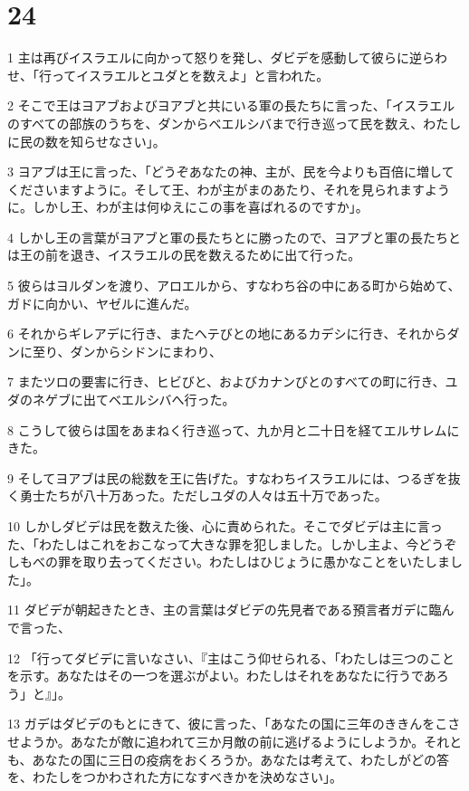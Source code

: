 \chapter{24}

\par 1 主は再びイスラエルに向かって怒りを発し、ダビデを感動して彼らに逆らわせ、「行ってイスラエルとユダとを数えよ」と言われた。
\par 2 そこで王はヨアブおよびヨアブと共にいる軍の長たちに言った、「イスラエルのすべての部族のうちを、ダンからベエルシバまで行き巡って民を数え、わたしに民の数を知らせなさい」。
\par 3 ヨアブは王に言った、「どうぞあなたの神、主が、民を今よりも百倍に増してくださいますように。そして王、わが主がまのあたり、それを見られますように。しかし王、わが主は何ゆえにこの事を喜ばれるのですか」。
\par 4 しかし王の言葉がヨアブと軍の長たちとに勝ったので、ヨアブと軍の長たちとは王の前を退き、イスラエルの民を数えるために出て行った。
\par 5 彼らはヨルダンを渡り、アロエルから、すなわち谷の中にある町から始めて、ガドに向かい、ヤゼルに進んだ。
\par 6 それからギレアデに行き、またヘテびとの地にあるカデシに行き、それからダンに至り、ダンからシドンにまわり、
\par 7 またツロの要害に行き、ヒビびと、およびカナンびとのすべての町に行き、ユダのネゲブに出てベエルシバへ行った。
\par 8 こうして彼らは国をあまねく行き巡って、九か月と二十日を経てエルサレムにきた。
\par 9 そしてヨアブは民の総数を王に告げた。すなわちイスラエルには、つるぎを抜く勇士たちが八十万あった。ただしユダの人々は五十万であった。
\par 10 しかしダビデは民を数えた後、心に責められた。そこでダビデは主に言った、「わたしはこれをおこなって大きな罪を犯しました。しかし主よ、今どうぞしもべの罪を取り去ってください。わたしはひじょうに愚かなことをいたしました」。
\par 11 ダビデが朝起きたとき、主の言葉はダビデの先見者である預言者ガデに臨んで言った、
\par 12 「行ってダビデに言いなさい、『主はこう仰せられる、「わたしは三つのことを示す。あなたはその一つを選ぶがよい。わたしはそれをあなたに行うであろう」と』」。
\par 13 ガデはダビデのもとにきて、彼に言った、「あなたの国に三年のききんをこさせようか。あなたが敵に追われて三か月敵の前に逃げるようにしようか。それとも、あなたの国に三日の疫病をおくろうか。あなたは考えて、わたしがどの答を、わたしをつかわされた方になすべきかを決めなさい」。
